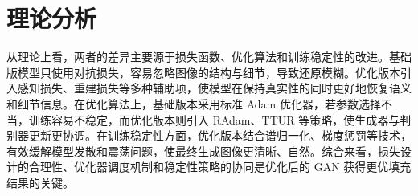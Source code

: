 \documentclass[12pt, a4paper, oneside]{ctexart}
\numberwithin{equation}{section}  %
\begin{document}
\section{理论分析}
从理论上看，两者的差异主要源于损失函数、优化算法和训练稳定性的改进。基础版模型只使用对抗损失，容易忽略图像的结构与细节，导致还原模糊。优化版本引入感知损失、重建损失等多种辅助项，使模型在保持真实性的同时更好地恢复语义和细节信息。在优化算法上，基础版本采用标准 Adam 优化器，若参数选择不当，训练容易不稳定，而优化版本则引入 RAdam、TTUR 等策略，使生成器与判别器更新更协调。在训练稳定性方面，优化版本结合谱归一化、梯度惩罚等技术，有效缓解模型发散和震荡问题，使最终生成图像更清晰、自然。综合来看，损失设计的合理性、优化器调度机制和稳定性策略的协同是优化后的 GAN 获得更优填充结果的关键。
\end{document}

